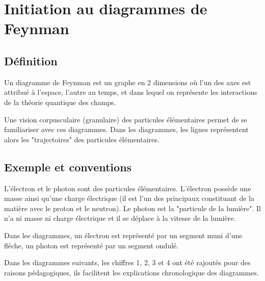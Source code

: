 

\section{Initiation au diagrammes de Feynman \cite{diagrammesFeynman}}


\label{JeanLucDeziel}

\subsection{Définition}

Un diagramme de Feynman est un graphe en 2 dimensions où l'un des axes est attribué à l'espace, l'autre au temps, et dans lequel on représente les interactions de la théorie quantique des champs. 



Une vision corpusculaire (granulaire) des particules élémentaires permet de se familiariser avec ces diagrammes. Dans les diagrammes, les lignes représentent alors les "trajectoires" des particules élémentaires.


\subsection{Exemple et conventions}

L'électron et le photon sont des particules élémentaires. L'électron possède une masse ainsi qu'une charge électrique (il est l'un des principaux constituant de la matière avec le proton et le neutron). Le photon est la "particule de la lumière". Il n'a ni masse ni charge électrique et il se déplace à la vitesse de la lumière.


Dans les diagrammes, un électron est représenté par un segment muni d'une flêche, un photon est représenté par un segment ondulé.

Dans les diagrammes suivants, les chiffres 1, 2, 3 et 4 ont été rajoutés pour des raisons pédagogiques, ils facilitent les explications chronologique des diagrammes.
\vspace{0.9cm}

